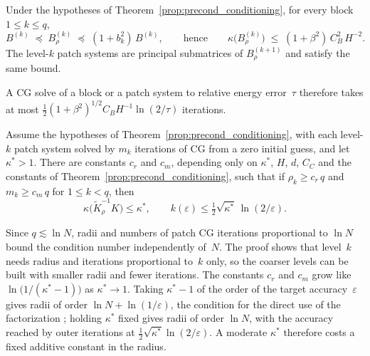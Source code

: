 \documentclass[hidelinks]{siamart}
\theoremstyle{nonumberplain}
\numberwithin{theorem}{section}
\begin{document}
\begin{corollary}\label{thm:localized_block_conditioning}
Under the hypotheses of Theorem~\ref{prop:precond_conditioning}, for
every block $1 \leq k \leq q$,
\begin{equation}\label{eq:localized_block_conditioning}
  B^{(k)} \;\preceq\; B^{(k)}_\rho \;\preceq\; (1 + b_k^2)\, B^{(k)},
  \qquad\text{hence}\qquad
  \kappa\bigl(B^{(k)}_\rho\bigr)
  \;\leq\; (1+\beta^2)\, C_B^2\, H^{-2}.
\end{equation}
The level-$k$ patch systems are principal submatrices of
$B^{(k+1)}_\rho$ and satisfy the same bound.
\end{corollary}

\noindent A CG solve of a block or a patch system to relative energy
error~$\tau$ therefore takes at most
$\tfrac12 (1+\beta^2)^{1/2} C_B H^{-1} \ln(2/\tau)$ iterations.

\begin{corollary}\label{cor:asymptotic}
Assume the hypotheses of Theorem~\ref{prop:precond_conditioning}, with
each level-$k$ patch system solved by $m_k$ iterations of CG from a zero
initial guess, and let $\kappa^\ast > 1$.  There are constants $c_r$
and $c_m$, depending only on $\kappa^\ast$, $H$, $d$, $C_C$ and the
constants of Theorem~\ref{prop:precond_conditioning}, such that if
$\rho_k \geq c_r\, q$ and $m_k \geq c_m\, q$ for $1 \leq k < q$, then
\[
  \kappa\bigl(\widetilde{K}_\rho^{-1} K\bigr) \leq \kappa^\ast,
  \qquad
  k(\varepsilon) \leq \tfrac12 \sqrt{\kappa^\ast}\, \ln(2/\varepsilon).
\]
\end{corollary}

Since $q \lesssim \ln N$, radii and numbers of patch CG iterations
proportional to $\ln N$ bound the condition number independently of~$N$.
The proof shows that level~$k$ needs radius and iterations proportional
to~$k$ only, so the coarser levels can be built with smaller radii and
fewer iterations.  The constants $c_r$ and $c_m$ grow like
$\ln\bigl(1/(\kappa^\ast-1)\bigr)$ as $\kappa^\ast \to 1$.  Taking
$\kappa^\ast - 1$ of the order of the target accuracy~$\varepsilon$ gives
radii of order $\ln N + \ln(1/\varepsilon)$, the condition for the direct
use of the factorization \cite[Thm.~16.32]{Owhadi_Scovel_2019}; holding
$\kappa^\ast$ fixed gives radii of order $\ln N$, with the accuracy
reached by outer iterations at $\tfrac12\sqrt{\kappa^\ast}\ln(2/\varepsilon)$.
A moderate $\kappa^\ast$ therefore costs a fixed additive constant in the
radius.
\end{document}
